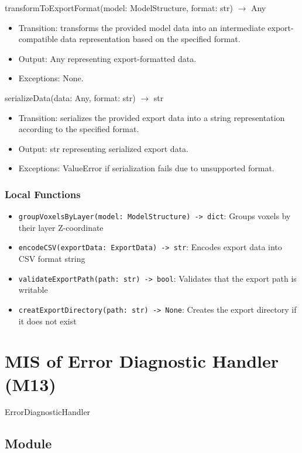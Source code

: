 \documentclass[12pt, titlepage]{article}
\begin{document}
transformToExportFormat(model: ModelStructure, format: str) $\rightarrow$ Any
\begin{itemize}
  \item Transition: transforms the provided model data into an intermediate export-compatible data representation based on the specified format.
  \item Output: Any representing export-formatted data.
  \item Exceptions: None.
\end{itemize}

serializeData(data: Any, format: str) $\rightarrow$ str
\begin{itemize}
  \item Transition: serializes the provided export data into a string representation according to the specified format.
  \item Output: str representing serialized export data.
  \item Exceptions: ValueError if serialization fails due to unsupported format.
\end{itemize}


\subsubsection{Local Functions}

\begin{itemize}
\item \texttt{groupVoxelsByLayer(model: ModelStructure) -> dict}: Groups voxels by their layer Z-coordinate
\item \texttt{encodeCSV(exportData: ExportData) -> str}: Encodes export data into CSV format string
\item \texttt{validateExportPath(path: str) -> bool}: Validates that the export path is writable
\item \texttt{creatExportDirectory(path: str) -> None}: Creates the export directory if it does not exist
\end{itemize}

\newpage

\section{MIS of Error Diagnostic Handler (M13)}\label{Module16}

ErrorDiagnosticHandler

\subsection{Module}
\end{document}
